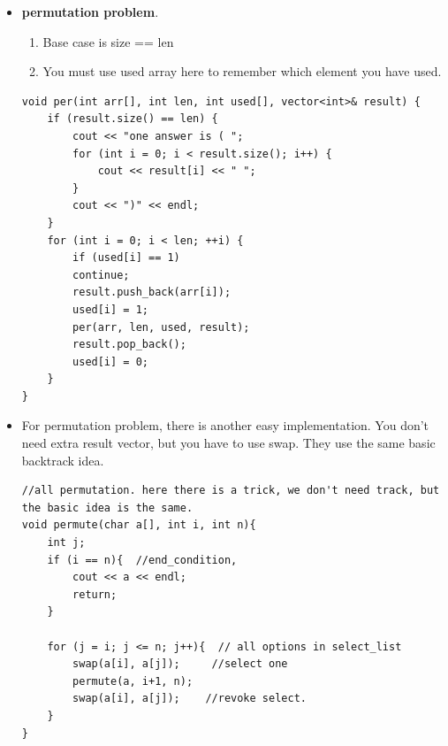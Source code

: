 \documentclass[a4paper,11pt,twoside]{book}
\begin{document}
\begin{itemize}
	\item \textbf{permutation problem}. 
\begin{enumerate}
	\item Base case is size == len
	\item You must use used array here to remember which element you have used. 
\end{enumerate}
\begin{lstlisting}
void per(int arr[], int len, int used[], vector<int>& result) {
	if (result.size() == len) {
		cout << "one answer is ( ";
		for (int i = 0; i < result.size(); i++) {
			cout << result[i] << " ";
		}
		cout << ")" << endl;
	}
	for (int i = 0; i < len; ++i) {
		if (used[i] == 1)
		continue;
		result.push_back(arr[i]); 
		used[i] = 1;
		per(arr, len, used, result);
		result.pop_back();
		used[i] = 0;
	}
}	
\end{lstlisting}
	\item For permutation problem, there is another easy implementation. You don't need extra result vector, but you have to use swap. They use the same basic backtrack idea.
\begin{lstlisting}
//all permutation. here there is a trick, we don't need track, but the basic idea is the same. 
void permute(char a[], int i, int n){
	int j;
	if (i == n){  //end_condition, 
		cout << a << endl;
		return;
	}
	
	for (j = i; j <= n; j++){  // all options in select_list
		swap(a[i], a[j]);     //select one
		permute(a, i+1, n);
		swap(a[i], a[j]);    //revoke select.
	}
} 	

\end{lstlisting}

\end{itemize}
\end{document}
